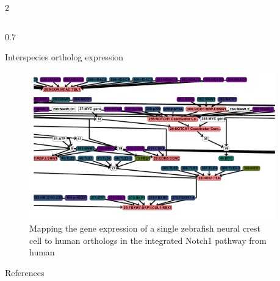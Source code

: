 \documentclass[final]{beamer}
\newlength{\sepwidth}
\newlength{\colwidth}
\newcommand{\separatorcolumn}{\begin{column}{\sepwidth}\end{column}}
\begin{document}
\begin{frame}[t,fragile]
\begin{columns}[t]
\begin{column}{2\colwidth}
\begin{columns}[t]
\begin{column}{0.7\colwidth}
      \begin{exampleblock}{Interspecies ortholog expression}
    
        \begin{figure}
          \centering
          \includegraphics[scale=0.75]{Image/orthomap_GID.pdf}
          \caption{Mapping the gene expression of a single zebrafish neural crest cell to human orthologs in the integrated Notch1 pathway from human}
        \end{figure}
    
      \end{exampleblock}
      \begin{block}{References}
        \nocite{*}
        \tiny{}      
      \end{block}
  \end{column}
\end{columns}
  

\end{column}

\separatorcolumn
\end{columns}
\end{frame}
\end{document}
